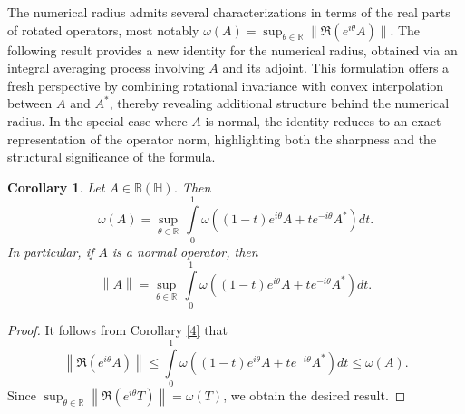 \documentclass[12pt,twoside,reqno]{amsart}
\newtheorem{corollary}{Corollary}[section]
\numberwithin{equation}{section}
\begin{document}
The numerical radius admits several characterizations in terms of the real parts of rotated operators, most notably
\(\omega(A)=\sup_{\theta\in\mathbb{R}}\|\Re(e^{i\theta}A)\|\).
The following result provides a new identity for the numerical radius, obtained via an integral averaging process involving $A$ and its adjoint. This formulation offers a fresh perspective by combining rotational invariance with convex interpolation between $A$ and $A^*$, thereby revealing additional structure behind the numerical radius. In the special case where $A$ is normal, the identity reduces to an exact representation of the operator norm, highlighting both the sharpness and the structural significance of the formula.
\begin{corollary}
Let $A\in \mathbb B\left( \mathbb H \right)$. Then
\[\omega \left( A \right)=\underset{\theta \in \mathbb{R}}{\mathop{\sup }}\,\int\limits_{0}^{1}{\omega \left( \left( 1-t \right){{e}^{i\theta }}A+t{{e}^{-i\theta }}{{A}^{*}} \right)dt}.\]
In particular, if $A$ is a normal operator, then
\[\left\| A \right\|=\underset{\theta \in \mathbb{R}}{\mathop{\sup }}\,\int\limits_{0}^{1}{\omega \left( \left( 1-t \right){{e}^{i\theta }}A+t{{e}^{-i\theta }}{{A}^{*}} \right)dt}.\]
\end{corollary}
\begin{proof}
It follows from Corollary \ref{4} that
	\[\left\| \Re \left( {{e}^{i\theta }}A \right) \right\|\le \int\limits_{0}^{1}{\omega \left( \left( 1-t \right){{e}^{i\theta }}A+t{{e}^{-i\theta }}{{A}^{*}} \right)dt}\le \omega \left( A \right).\]
Since ${{\sup }_{\theta \in \mathbb{R}}}\left\| \Re\left( {{e}^{i\theta }}T \right) \right\|=\omega \left( T \right)$, we obtain the desired result.
\end{proof}
\end{document}
